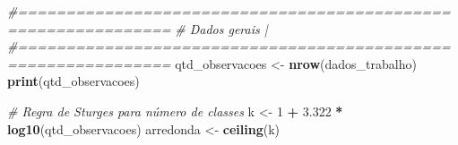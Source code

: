 \documentclass[
]{article}
\newenvironment{Shaded}{\begin{snugshade}}{\end{snugshade}}
\newcommand{\CommentTok}[1]{\textcolor[rgb]{0.56,0.35,0.01}{\textit{#1}}}
\newcommand{\DecValTok}[1]{\textcolor[rgb]{0.00,0.00,0.81}{#1}}
\newcommand{\FloatTok}[1]{\textcolor[rgb]{0.00,0.00,0.81}{#1}}
\newcommand{\FunctionTok}[1]{\textcolor[rgb]{0.13,0.29,0.53}{\textbf{#1}}}
\newcommand{\NormalTok}[1]{#1}
\newcommand{\OtherTok}[1]{\textcolor[rgb]{0.56,0.35,0.01}{#1}}
\newcommand{\SpecialCharTok}[1]{\textcolor[rgb]{0.81,0.36,0.00}{\textbf{#1}}}
\begin{document}
\begin{Shaded}
\begin{Highlighting}[]
\CommentTok{\#==============================================================}
\CommentTok{\# Dados gerais                                                |}
\CommentTok{\#==============================================================}
\NormalTok{qtd\_observacoes }\OtherTok{\textless{}{-}} \FunctionTok{nrow}\NormalTok{(dados\_trabalho)}
\FunctionTok{print}\NormalTok{(qtd\_observacoes)}

\CommentTok{\# Regra de Sturges para número de classes}
\NormalTok{k }\OtherTok{\textless{}{-}} \DecValTok{1} \SpecialCharTok{+} \FloatTok{3.322} \SpecialCharTok{*} \FunctionTok{log10}\NormalTok{(qtd\_observacoes)}
\NormalTok{arredonda }\OtherTok{\textless{}{-}} \FunctionTok{ceiling}\NormalTok{(k)}
\end{Highlighting}
\end{Shaded}
\end{document}
